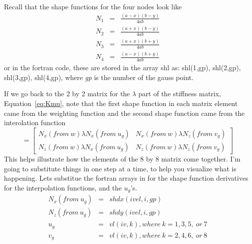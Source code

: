 \documentclass{article}
\begin{document}
Recall that the shape functions for the four nodes look like
\begin{eqnarray} 
N_1 & = & \frac{(a-x)(b-y)}{4ab}  \\ 
N_2 & = & \frac{(a+x)(b-y)}{4ab}  \\ 
N_3 & = & \frac{(a+x)(b+y)}{4ab}  \\ 
N_4 & = & \frac{(a-x)(b+y)}{4ab}  
\end{eqnarray}
or in the fortran code, these are stored in the array shl as: shl(1,gp),
shl(2,gp), shl(3,gp), shl(4,gp), where {\em gp} is the number of the gauss 
point.

If we go back to the 2 by 2 matrix for the $\lambda$ part of the stiffness
matrix, Equation~\ref{eq:Kmu}, note that the first shape function in each
matrix element came from the weighting function and the second shape function
came from the interolation function
\begin{equation}  [K_{\lambda}] = \left[ 
\begin{array}{cc} 
N_x(from~w) \lambda N_x(from~u_g) &  N_x(from~w) \lambda N_z(from~v_g) \\  
N_z(from~w) \lambda N_x(from~u_g) &  N_z(from~w) \lambda N_z(from~v_g) 
\end{array} \right ] 
\end{equation}
This helps illustrate how the elements of the 8 by 8 matrix come together.  I'm
going to substitute things in one step at a time, to help you visualize what is
happening.  Lets substitue the fortran arrays in for the shape function
derivatives for the interpolation functions, and the $u_g$'s.
\begin{eqnarray}
N_x(from~u_g) & = & shdx(ivel,i,gp) \\
N_z(from~u_g) & = & shdy(ivel,i,gp) \\
u_g           & = & vl(iv,k), where~k=1,3,5,~or~7 \\
v_g           & = & vl(iv,k), where~k=2,4,6,~or~8
\end{eqnarray}
\end{document}
